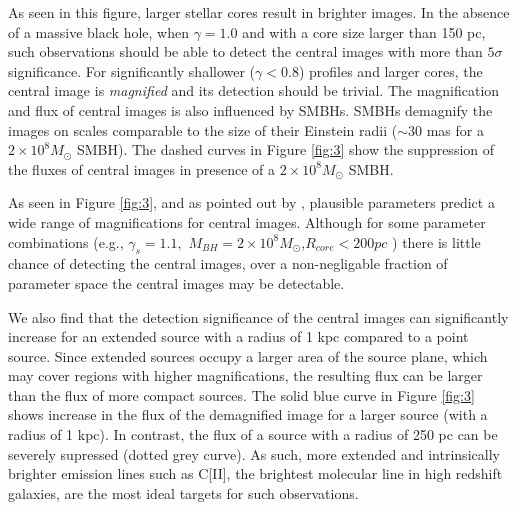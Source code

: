\documentclass[chicago]{emulateapj}
\newcommand{\red}{\textcolor{red}}
\begin{document}
As seen in this figure, larger stellar cores result in brighter images. %
In the absence of a massive black hole, when $\gamma=1.0$ and with a core size larger than 150 pc, such observations should be able to detect the central images with more than $5\sigma$ significance. For significantly shallower ($\gamma<0.8$) profiles and larger cores, the central image is \emph{magnified} and its detection should be trivial.  The magnification and flux of central images is also influenced by SMBHs.
SMBHs demagnify the images on scales comparable to the size of their Einstein radii ($\sim30$ mas for a $2\times10^8M_{\odot}$ SMBH).
The dashed curves in Figure \ref{fig:3} show the suppression of the fluxes of central images in presence of a $2\times10^8M_{\odot}$ SMBH.

As seen in Figure \ref{fig:3}, and as pointed out by \citet{Keeton:03}, plausible parameters predict  a wide range of magnifications for   central images. Although for some parameter combinations (e.g., $\gamma_{s}=1.1,$ $M_{BH} = 2\times10^8 M_{\odot}$,$R_{core}<200 pc$ ) there is little chance of detecting the central images, over a non-negligable fraction of parameter space the central images may be detectable. 

We also find that the detection significance of the central images can significantly increase for an extended source with a radius of 1 kpc compared to a point source. Since extended sources occupy a larger area of the source plane, which may cover regions with higher magnifications, the resulting flux can be larger than the flux of more compact sources. The solid blue curve in Figure \ref{fig:3} shows increase in the flux of the demagnified image for a larger source (with a radius of 1 kpc). In contrast, the flux of a source with a radius of 250 pc can be severely supressed (dotted grey curve). As such, more extended and intrinsically brighter emission lines such as C[II], the brightest molecular line in high redshift galaxies, are the most ideal targets for such observations. 
\end{document}
